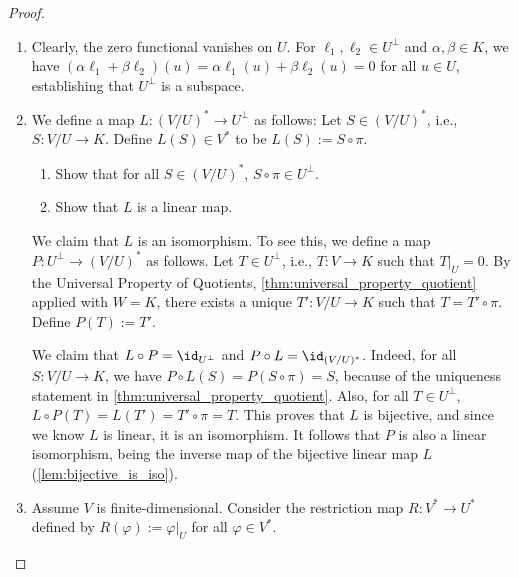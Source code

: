 \begin{proof}
  \begin{enumerate}
    \item Clearly, the zero functional vanishes on $U$. For $\ell_1, \ell_2 \in U^\perp$ and $\alpha, \beta \in K$, we have $(\alpha \ell_1 + \beta \ell_2)(u) = \alpha \ell_1(u) + \beta \ell_2(u) = 0$ for all $u \in U$, establishing that $U^\perp$ is a subspace.

    \item We define a map $L \colon (V/U)^* \to U^\perp$ as follows: Let $S \in (V/U)^*$, i.e., $S \colon V/U \to K$. Define $L(S) \in V^*$ to be $L(S) := S \circ \pi$.

    \begin{exercise}
      \label{exc:annihilator_L}
      \begin{enumerate}[label=\textbf{(\alph*)}]
        \item Show that for all $S \in (V/U)^*$, $S \circ \pi \in U^\perp$.
        \item Show that $L$ is a linear map.
      \end{enumerate}
\end{exercise}
    
    We claim that $L$ is an isomorphism. To see this, we define a map $P \colon U^\perp \to (V/U)^*$ as follows. Let $T \in U^\perp$, i.e., $T \colon V \to K$ such that $T|_U = 0$. By the Universal Property of Quotients, \cref{thm:universal_property_quotient} applied with $W = K$, there exists a unique $T' \colon V/U \to K$ such that $T = T' \circ \pi$. Define $P(T) := T'$.

    We claim that $L \circ P = \id_{U^\perp}$ and $P \circ L = \id_{(V/U)^*}$. Indeed, for all $S \colon V/U \to K$, we have $P \circ L(S) = P(S \circ \pi) = S$, because of the uniqueness statement in \cref{thm:universal_property_quotient}. Also, for all $T \in U^\perp$, $L \circ P(T) = L(T') = T' \circ \pi = T$. This proves that $L$ is bijective, and since we know $L$ is linear, it is an isomorphism. It follows that $P$ is also a linear isomorphism, being the inverse map of the bijective linear map $L$ (\cref{lem:bijective_is_iso}).

    \item Assume $V$ is finite-di\-men\-sional. Consider the restriction map $R \colon V^* \to U^*$ defined by $R(\varphi) := \varphi|_U$ for all $\varphi \in V^*$. 


\end{enumerate}
\end{proof}
